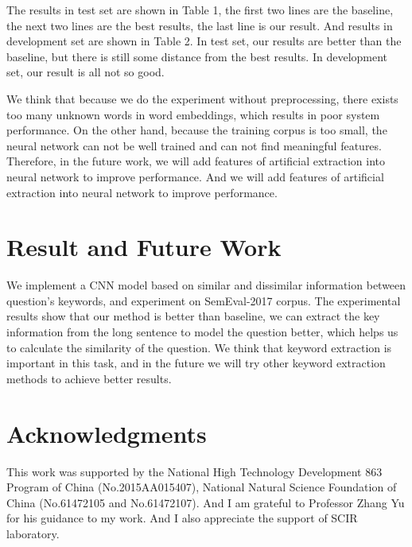 \documentclass[11pt,a4paper]{article}
\begin{document}
The results in test set are shown in Table 1, the first two lines are the baseline, the next two lines are the best results, the last line is our result. And results in development set are shown in Table 2. In test set, our results are better than the baseline, but there is still some distance from the best results. In development set, our result is all not so good. 

We think that because we do the experiment without preprocessing, there exists too many unknown words in word embeddings, which results in poor system performance. On the other hand, because the training corpus is too small, the neural network can not be well trained and can not find meaningful features. Therefore, in the future work, we will add features of artificial extraction into neural network to improve performance. And we will add features of artificial extraction into neural network to improve performance.

\section{Result and Future Work}
We implement a CNN model based on similar and dissimilar information between question’s keywords, and experiment on SemEval-2017 corpus. The experimental results show that our method is better than baseline, we can extract the key information from the long sentence to model the question better, which helps us to calculate the similarity of the question. We think that keyword extraction is important in this task, and in the future we will try other keyword extraction methods to achieve better results.

\section*{Acknowledgments}
This work was supported by the National High Technology Development 863 Program of China (No.2015AA015407), National Natural Science Foundation of China (No.61472105 and No.61472107). And I am grateful to Professor Zhang Yu for his guidance to my work. And I also appreciate the support of SCIR laboratory.
%
%



\appendix
\end{document}
